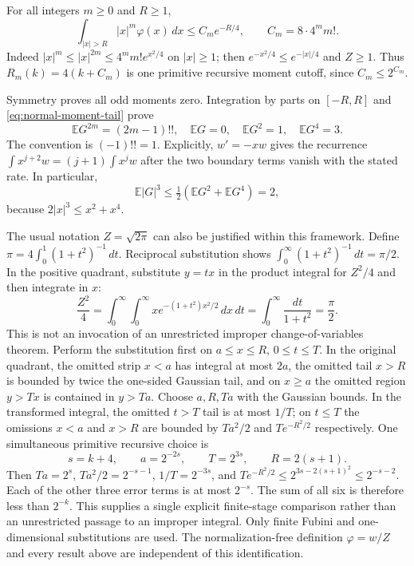 For all integers $m\geq0$ and $R\geq1$,
\begin{equation}
 \int_{|x|>R}|x|^m\varphi(x)\,dx
 \leq C_m e^{-R/4},\qquad C_m=8\cdot4^m m!.
 \label{eq:normal-moment-tail}
\end{equation}
Indeed $|x|^m\leq|x|^{2m}\leq4^m m!e^{x^2/4}$ on $|x|\geq1$;
then $e^{-x^2/4}\leq e^{-|x|/4}$ and $Z\geq1$.  Thus
$R_m(k)=4(k+C_m)$ is one primitive recursive moment cutoff, since
$C_m\leq2^{C_m}$.

Symmetry proves all odd moments zero.  Integration by parts on $[-R,R]$
and \eqref{eq:normal-moment-tail} prove
\begin{equation}
 \mathbb E G^{2m}=(2m-1)!!,\quad
 \mathbb E G=0,\quad \mathbb E G^2=1,\quad \mathbb E G^4=3.
 \label{eq:normal-moments}
\end{equation}
The convention is $(-1)!!=1$.  Explicitly, $w'=-xw$ gives the recurrence
$\int x^{j+2}w=(j+1)\int x^jw$ after the two boundary terms vanish with
the stated rate.  In particular,
\begin{equation}
 \mathbb E|G|^3\leq\tfrac12(\mathbb E G^2+\mathbb E G^4)=2,
 \label{eq:normal-third}
\end{equation}
because $2|x|^3\leq x^2+x^4$.

The usual notation $Z=\sqrt{2\pi}$ can also be justified within this
framework.  Define $\pi=4\int_0^1(1+t^2)^{-1}\,dt$.  Reciprocal substitution
shows $\int_0^\infty(1+t^2)^{-1}\,dt=\pi/2$.  In the positive quadrant,
substitute $y=tx$ in the product integral for $Z^2/4$ and then integrate in
$x$:
\[
 \frac{Z^2}{4}
 =\int_0^\infty\int_0^\infty
      x e^{-(1+t^2)x^2/2}\,dx\,dt
 =\int_0^\infty\frac{dt}{1+t^2}=\frac\pi2.
\]
This is not an invocation of an unrestricted improper change-of-variables
theorem.  Perform the substitution first on $a\leq x\leq R$, $0\leq t\leq T$.
In the original quadrant, the omitted strip $x<a$ has integral at most $2a$,
the omitted tail $x>R$ is bounded by twice the one-sided Gaussian tail, and
on $x\geq a$ the omitted region $y>Tx$ is contained in $y>Ta$.  Choose
$a,R,Ta$ with the Gaussian bounds.  In the transformed integral, the omitted
$t>T$ tail is at most $1/T$; on $t\leq T$ the omissions $x<a$ and $x>R$
are bounded by $Ta^2/2$ and $T e^{-R^2/2}$ respectively.  One simultaneous primitive recursive choice is
\[
 s=k+4,\qquad a=2^{-2s},\qquad T=2^{3s},\qquad R=2(s+1).
\]
Then $Ta=2^s$, $Ta^2/2=2^{-s-1}$, $1/T=2^{-3s}$, and
$T e^{-R^2/2}\leq2^{3s-2(s+1)^2}\leq2^{-s-2}$.
Each of the other three error terms is at most $2^{-s}$.  The sum of all
six is therefore less than $2^{-k}$.  This supplies a single explicit
finite-stage comparison rather than an unrestricted passage to an improper
integral.  Only finite Fubini and one-dimensional substitutions are used.  The normalization-free definition
$\varphi=w/Z$ and every result above are independent of this identification.

